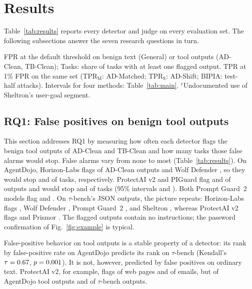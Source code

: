 \section{Results}
\label{sec:results}

Table~\ref{tab:results} reports every detector and judge on every evaluation set. The following subsections answer the seven research questions in turn.

\begin{table}[t]
\centering\footnotesize
\caption{False-positive rate (FPR) and detection (TPR) of all methods on all evaluation sets, in percent, sorted by TPR on AD-Matched. Best value per column in bold (lowest FPR and blocked-task rate, highest TPR).}
\label{tab:results}

\par\smallskip\footnotesize\raggedright
FPR at the default threshold on benign text (General) or tool outputs (AD-Clean, TB-Clean); Tasks: share of tasks with at least one flagged output. TPR at 1\% FPR on the same set (TPR$_{\mathrm{M}}$: AD-Matched; TPR$_{\mathrm{S}}$: AD-Shift; BIPIA: test-half attacks). Intervals for four methods: Table~\ref{tab:main}.
$^{\mathrm{c}}$Undocumented use of Sheltron's user-goal segment.
\end{table}

\subsection{RQ1: False positives on benign tool outputs}
\label{sec:rq1}

This section addresses RQ1 by measuring how often each detector flags the benign tool outputs of AD-Clean and TB-Clean and how many tasks those false alarms would stop. False alarms vary from none to most (Table~\ref{tab:results}). On AgentDojo, Horizon-Labs flags \MHZClean of AD-Clean outputs and Wolf Defender \MWFClean, so they would stop \MHZBlock and \MWFBlock of tasks, respectively. ProtectAI v2 and PIGuard flag \CleanPAFPR and \CleanPGFPR of outputs and would stop \CleanPABlock and \CleanPGBlock of tasks (95\% intervals \CleanPABlockCI{} and \CleanPGBlockCI{}). Both Prompt Guard~2 models flag \MPGtClean and \MPGtsClean. On $\tau$-bench's JSON outputs, the picture repeats: Horizon-Labs flags \TBFPRHZ, Wolf Defender \TBFPRWF, Prompt Guard~2 \TBFPRPGt, and Sheltron \TBFPRSH, whereas ProtectAI v2 flags \TBFPRPA and Prismor \TBFPRPR. The flagged outputs contain no instructions; the password confirmation of Fig.~\ref{fig:example} is typical.

False-positive behavior on tool outputs is a stable property of a detector: its rank by false-positive rate on AgentDojo predicts its rank on $\tau$-bench (Kendall's $\tau=0.67$, $p=0.001$). It is not, however, predicted by false positives on ordinary text. ProtectAI v2, for example, flags \GenPAWebFPR of web pages and \GenPAEmailFPR of emails, but \CleanPAFPR of AgentDojo tool outputs and \TBFPRPA of $\tau$-bench outputs.

